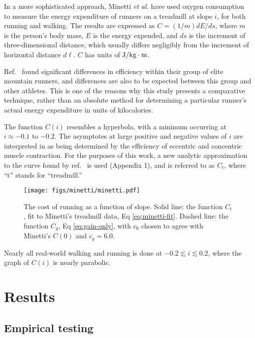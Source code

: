 \documentclass[10pt,letterpaper]{article}
\begin{document}
In a more sophisticated approach, Minetti \emph{et al.}\cite{minetti} have used oxygen
consumption to measure the energy expenditure of runners on a treadmill at slope $i$, for both
running and walking.
The results are expressed as $C=(1/m)d E/d s$, where $m$ is the person's body mass,
$E$ is the energy expended, and $d s$ is the increment of three-dimensional distance, which
usually differs negligibly from the increment of horizontal distance $d \ell$.
$C$ has units of $\textup{J}/\textup{kg}\cdot\textup{m}$.

Ref.~\cite{minetti} found significant differences in efficiency within their group of elite mountain
runners, and differences are also to be expected between this group and other athletes. This is one
of the reasons why this study presents a comparative technique, rather than an absolute method for
determining a particular runner's actual energy expenditure in units of kilocalories.

The function $C(i)$ resembles a hyperbola, with a
minimum occurring at $i\approx -0.1$ to $-0.2$. 
The asymptotes
at large positive and negative values of $i$ are interpreted in \cite{minetti} as being determined by the
efficiency of eccentric and concentric muscle contraction. For the purposes of this work, a new analytic
approximation to the curve found by ref.~\cite{minetti} is used (Appendix 1), and is referred to as
$C_t$, where ``t'' stands for ``treadmill.''

\begin{figure}[h]
\texttt{[image: figs/minetti/minetti.pdf]}
\centering
\caption{The cost of running as a function of slope. Solid line: the function $C_t$, fit to Minetti's treadmill data, Eq \ref{eq:minetti-fit}. Dashed line:
the function $C_g$, Eq \ref{eq:gain-only}, with $c_0$ chosen to agree with Minetti's $C(0)$ and $c_g=6.0$.}
\label{fig:minetti}
\end{figure}

Nearly all real-world walking and running is
done at $-0.2 \lesssim i \lesssim 0.2$, where the graph of $C(i)$ is nearly parabolic.

\section{Results}

\subsection{Empirical testing}
\end{document}
